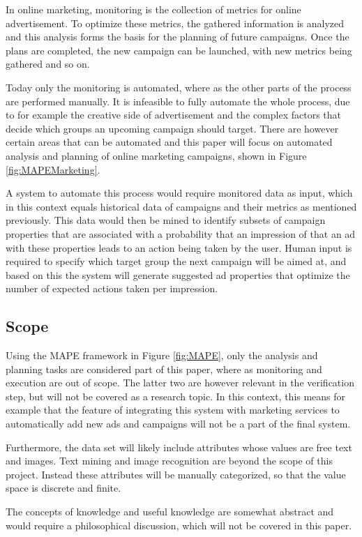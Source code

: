 \documentclass[a4paper]{article}
\begin{document}
In online marketing, monitoring is the collection of metrics for online advertisement. To optimize these metrics, the gathered information is analyzed and this analysis forms the basis for the planning of future campaigns. Once the plans are completed, the new campaign can be launched, with new metrics being gathered and so on.

Today only the monitoring is automated, where as the other parts of the process are performed manually. It is infeasible to fully automate the whole process, due to for example the creative side of advertisement and the complex factors that decide which groups an upcoming campaign should target. There are however certain areas that can be automated and this paper will focus on automated analysis and planning of online marketing campaigns, shown in Figure \ref{fig:MAPEMarketing}.

A system to automate this process would require monitored data as input, which in this context equals historical data of campaigns and their metrics as mentioned previously. This data would then be mined to identify subsets of campaign properties that are associated with a probability that an impression of that an ad with these properties leads to an action being taken by the user. Human input is required to specify which target group the next campaign will be aimed at, and based on this the system will generate suggested ad properties that optimize the number of expected actions taken per impression.

\subsection{Scope}
Using the MAPE framework in Figure \ref{fig:MAPE}, only the analysis and planning tasks are considered part of this paper, where as monitoring and execution are out of scope. The latter two are however relevant in the verification step, but will not be covered as a research topic. In this context, this means for example that the feature of integrating this system with marketing services to automatically add new ads and campaigns will not be a part of the final system.

Furthermore, the data set will likely include attributes whose values are free text and images. Text mining and image recognition are beyond the scope of this project. Instead these attributes will be manually categorized, so that the value space is discrete and finite.

The concepts of knowledge and useful knowledge are somewhat abstract and would require a philosophical discussion, which will not be covered in this paper.
\end{document}
